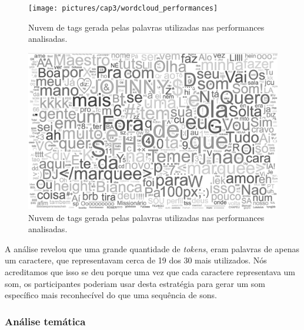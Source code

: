 \begin{figure}[ht!]

\texttt{[image: pictures/cap3/wordcloud\_performances]}
\caption{Nuvem de tags gerada pelas palavras utilizadas nas performances analisadas.}
\label{fig:clouds}
\end{figure}

\begin{figure}[ht!]

\includegraphics[width=1\linewidth]{pictures/cap3/wordcloud_pb}
\caption{Nuvem de tags gerada pelas palavras utilizadas nas performances analisadas. }
\label{fig:cloud}
\end{figure}

A análise revelou que uma grande quantidade de \emph{tokens}, eram palavras de apenas um caractere, que representavam cerca de 19 dos 30 mais utilizados. Nós acreditamos que isso se deu porque uma vez que cada caractere representava um som, os participantes poderiam usar desta estratégia para gerar um som específico mais reconhecível do que uma sequência de sons.


\subsubsection{Análise temática}
\label{sec:thematic}

